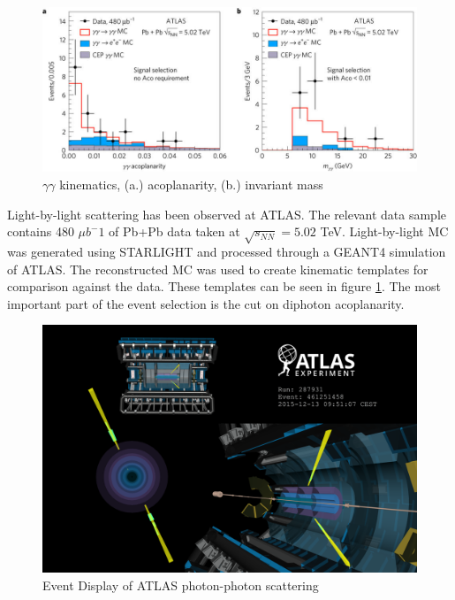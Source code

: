 \begin{figure}[]
\begin{centering}
\includegraphics[width=7in]{Chapter2/importfigs/nphys4208-f3.jpg}
\par\end{centering}
\caption{$\gamma \gamma$ kinematics, (a.) acoplanarity, (b.) invariant mass \cite{Aaboud:2017bwk} \label{fig:ggKin}}
\end{figure}

Light-by-light scattering has been observed at ATLAS. The relevant data sample contains 480 $\mu b^-1$ of Pb+Pb data taken at $\sqrt{s_{NN}}=5.02$ TeV. Light-by-light MC was generated using STARLIGHT and processed through a GEANT4 simulation of ATLAS. The reconstructed MC was used to create kinematic templates for comparison against the data. These templates can be seen in figure \ref{fig:ggKin}. The most important part of the event selection is the cut on diphoton acoplanarity. 

\begin{figure}[]
\begin{centering}
\includegraphics[width=5in]{Chapter2/importfigs/light-by-light-figure_2.png}
\par\end{centering}
\caption{Event Display of ATLAS photon-photon scattering \cite{Collaboration:2278547} \label{fig:atlasEvent}}
\end{figure}

